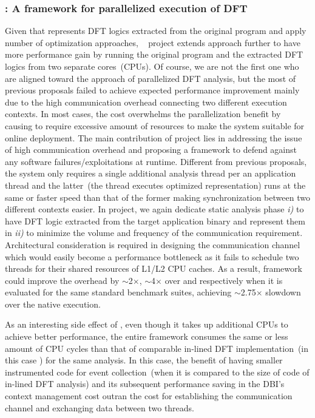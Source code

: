 \documentclass[letterpaper, 10pt]{article}
\begin{document}
\begin{small}
\subsubsection*{\SR: A framework for parallelized execution of DFT}
%
Given that \TFA represents DFT logics extracted from the original program and
apply number of optimization approaches, \SR~\cite{sreplica:2013ccs} project
extends \TFA approach further to have more performance gain by running the
original program and the extracted DFT logics from two separate cores~(CPUs).
%
Of course, we are not the first one who are aligned toward the approach of
parallelized DFT analysis, but the most of previous proposals failed to achieve
expected performance improvement mainly due to the high communication overhead
connecting two different execution contexts. In most cases, the cost overwhelms
the parallelization benefit by causing to require excessive amount of resources
to make the system suitable for online deployment.
%
The main contribution of \SR project lies in addressing the issue of high
communication overhead and proposing a framework  to defend against any
software failures/exploitations at runtime. Different from previous proposals,
the system only requires a single additional analysis thread per an application
thread and the latter~(the thread executes optimized \TFA representation) runs
at the  same or faster speed than that of the former making synchronization
between two different contexts easier.
%
In \SR project, we again dedicate static analysis phase {\it i)} to have DFT
logic extracted from the target application binary and represent them in \TFA
\xspace{\it ii)} to minimize the volume and frequency of the communication
requirement.
%
Architectural consideration is required in designing the communication channel
which would easily become a performance bottleneck as it fails to schedule two
threads for their shared resources of L1/L2 CPU caches.
%
As a result, \SR framework could improve the overhead by $\sim$2$\times$,
$\sim$4$\times$ over \TFA and \libdft respectively when it is evaluated for the
same standard benchmark suites, achieving $\sim$2.75$\times$ slowdown over the
native execution.

As an interesting side effect of \SR, even though it takes up additional CPUs
to achieve better performance, the entire framework consumes the same or less
amount of CPU cycles than that of comparable in-lined DFT implementation~(in
this case \TFA) for the same analysis.
%
In this case, the benefit of having smaller instrumented code for event
collection~(when it is compared to the size of code of in-lined DFT analysis)
and its subsequent performance saving in the DBI's context management cost
outran the cost for establishing the communication channel and exchanging data
between two threads.


\end{small}
\end{document}
